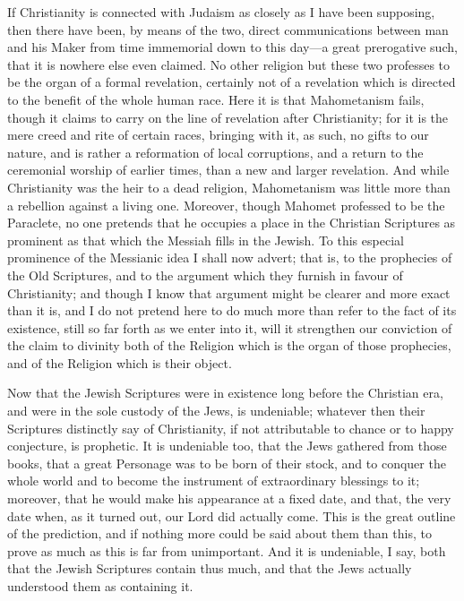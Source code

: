 If Christianity is connected with Judaism as closely as I have been
supposing, then there have been, by means of the two, direct
communications between man and his Maker from time immemorial down to
this day—a great prerogative such, that it is nowhere else even
claimed. No other religion but these two professes to be the organ of
a formal revelation, certainly not of a revelation which is directed
to the benefit of the whole human race. Here it is that Mahometanism
fails, though it claims to carry on the line of revelation after
Christianity; for it is the mere creed and rite of certain races,
bringing with it, as such, no gifts to our nature, and is rather a
reformation of local corruptions, and a return to the ceremonial
worship of earlier times, than a new and larger revelation. And while
Christianity was the heir to a dead religion, Mahometanism was little
more than a rebellion against a living one. Moreover, though Mahomet
professed to be the Paraclete, no one pretends that he occupies a
place in the Christian Scriptures as prominent as that which the
Messiah fills in the Jewish. To this especial prominence of the
Messianic idea I shall now advert; that is, to the prophecies of the
Old Scriptures, and to the argument which they furnish in favour of
Christianity; and though I know that argument might be clearer and
more exact than it is, and I do not pretend here to do much more
than refer to the fact of its existence, still so far forth as we
enter into it, will it strengthen our conviction of the claim to
divinity both of the Religion which is the organ of those prophecies,
and of the Religion which is their object.

Now that the Jewish Scriptures were in existence long before the
Christian era, and were in the sole custody of the Jews, is
undeniable; whatever then their Scriptures distinctly say of
Christianity, if not attributable to chance or to happy conjecture, is
prophetic. It is undeniable too, that the Jews gathered from those
books, that a great Personage was to be born of their stock, and to
conquer the whole world and to become the instrument of extraordinary
blessings to it; moreover, that he would make his appearance at a
fixed date, and that, the very date when, as it turned out, our Lord
did actually come. This is the great outline of the prediction, and if
nothing more could be said about them than this, to prove as much as
this is far from unimportant. And it is undeniable, I say, both that
the Jewish Scriptures contain thus much, and that the Jews actually
understood them as containing it.

